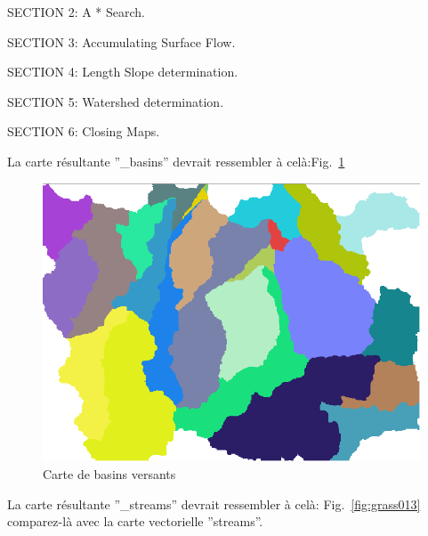 SECTION 2: A * Search. 

SECTION 3: Accumulating Surface Flow.

SECTION 4: Length Slope determination.

SECTION 5: Watershed determination.

SECTION 6: Closing Maps.

La carte r\'esultante ''\_basins'' devrait ressembler \`a cel\`a:Fig.~\ref{fig:grass012}

\begin{figure}[htbp]
   \centering
   \includegraphics[scale=0.35]{grass012.png}
   \caption{Carte de basins versants}
   \label{fig:grass012}
\end{figure}


La carte r\'esultante ''\_streams'' devrait ressembler \`a cel\`a: Fig.~\ref{fig:grass013} comparez-l\`a avec la carte vectorielle ''streams''.

